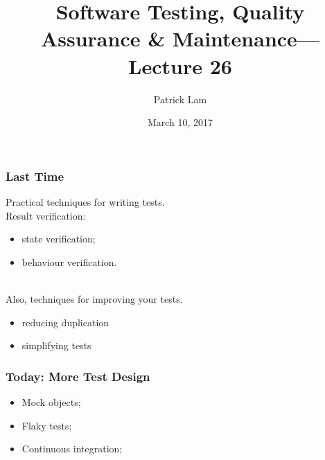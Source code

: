 \documentclass{beamer}
\title{Software Testing, Quality Assurance \& Maintenance---Lecture 26}
\author{Patrick Lam}
\date{March 10, 2017}
\newenvironment{changemargin}[1]{%
  \begin{list}{}{%
    \setlength{\topsep}{0pt}%
    \setlength{\leftmargin}{#1}%
    \setlength{\rightmargin}{1em}
    \setlength{\listparindent}{\parindent}%
    \setlength{\itemindent}{\parindent}%
    \setlength{\parsep}{\parskip}%
  }%
  \item[]}{\end{list}}
\begin{document}
\begin{frame}
  \titlepage
\end{frame}

\begin{frame}
\frametitle{Last Time}
  \Large
  \begin{changemargin}{1cm}
    Practical techniques for writing tests.\\[1em]

    Result verification:
    \begin{itemize}
    \item state verification;
    \item behaviour verification.
    \end{itemize}~\\

    Also, techniques for improving your tests.
    \begin{itemize}
    \item reducing duplication
    \item simplifying tests
    \end{itemize}

  \end{changemargin}
\end{frame}

\begin{frame}
  \frametitle{Today: More Test Design}

  \Large
  \begin{changemargin}{2cm}
\begin{itemize}
\item Mock objects;
\item Flaky tests;
\item Continuous integration;
\end{itemize}
  \end{changemargin}

\end{frame}
\end{document}
